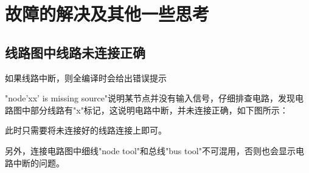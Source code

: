 \documentclass[UTF8]{ctexart}
\begin{document}
\begin{figure}[H]
{    \hspace{0.3mm}
    \restoregeometry
    }
\end{figure}\par

\section{故障的解决及其他一些思考}
\subsection{线路图中线路未连接正确}
如果线路中断，则全编译时会给出错误提示
\begin{figure}[H]
\end{figure}
"node'xx' is missing source"说明某节点并没有输入信号，仔细排查电路，发现电路图中部分线路有"x"标记，这说明电路中断，并未连接正确，如下图所示：
\begin{figure}[H]
\end{figure}
此时只需要将未连接好的线路连接上即可。\par
另外，连接电路图中细线"node tool"和总线"bus tool"不可混用，否则也会显示电路中断的问题。
\end{document}
